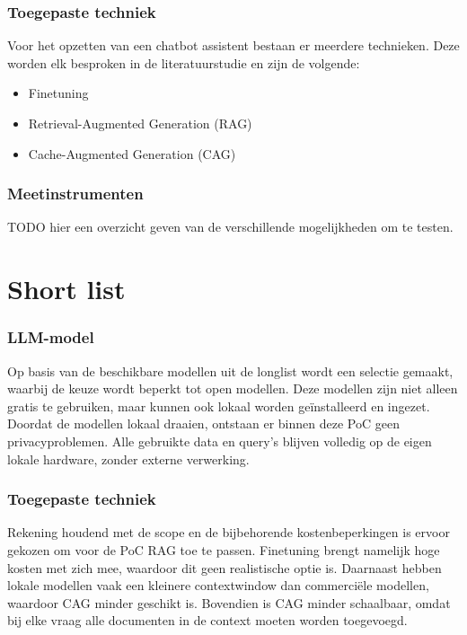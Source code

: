 \subsubsection{Toegepaste techniek}

Voor het opzetten van een chatbot assistent bestaan er meerdere technieken. Deze worden elk besproken in de literatuurstudie en zijn de volgende:
\begin{itemize}
    \item Finetuning
    \item Retrieval-Augmented Generation (RAG)
    \item Cache-Augmented Generation (CAG)
\end{itemize}

\subsubsection{Meetinstrumenten}
TODO hier een overzicht geven van de verschillende mogelijkheden om te testen. 

\section{Short list}

\subsubsection{LLM-model}

Op basis van de beschikbare modellen uit de longlist wordt een selectie gemaakt, waarbij de keuze wordt beperkt tot open modellen. Deze modellen zijn niet alleen gratis te gebruiken, maar kunnen ook lokaal worden geïnstalleerd en ingezet. Doordat de modellen lokaal draaien, ontstaan er binnen deze PoC geen privacyproblemen. Alle gebruikte data en query’s blijven volledig op de eigen lokale hardware, zonder externe verwerking.

\subsubsection{Toegepaste techniek}

Rekening houdend met de scope en de bijbehorende kostenbeperkingen is ervoor gekozen om voor de PoC RAG toe te passen. Finetuning brengt namelijk hoge kosten met zich mee, waardoor dit geen realistische optie is. Daarnaast hebben lokale modellen vaak een kleinere contextwindow dan commerciële modellen, waardoor CAG minder geschikt is. Bovendien is CAG minder schaalbaar, omdat bij elke vraag alle documenten in de context moeten worden toegevoegd.

